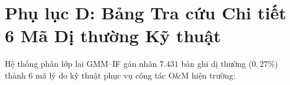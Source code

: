 \documentclass[12pt, a4paper]{report}
\begin{document}
\chapter*{Phụ lục D: Bảng Tra cứu Chi tiết 6 Mã Dị thường Kỹ thuật}
\label{app:outlier_matrix}
\renewcommand{\thetable}{D.\arabic{table}}
\setcounter{table}{0}
\renewcommand{\thefigure}{D.\arabic{figure}}
\setcounter{figure}{0}

Hệ thống phân lớp lai GMM--IF gán nhãn $7.431$ bản ghi dị thường ($0{,}27\%$) thành 6 mã lý do kỹ thuật phục vụ công tác O\&M hiện trường:
\end{document}
